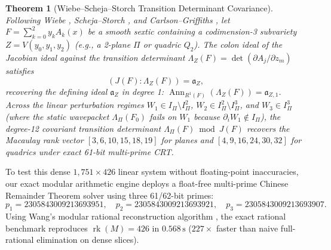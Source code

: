 \documentclass[11pt,a4paper]{article}
\newtheorem{theorem}{Theorem}[section]
\theoremstyle{definition}
\theoremstyle{remark}
\DeclareMathOperator{\rk}{rk}
\begin{document}
\begin{theorem}[Wiebe--Scheja--Storch Transition Determinant Covariance]
\label{thm:wiebe_covariance}
Following Wiebe \cite{Wiebe1969}, Scheja--Storch \cite{SchejaStorch1975}, and Carlson--Griffiths \cite{CarlsonGriffiths1980}, let $F = \sum_{k=0}^2 y_k A_k(x)$ be a smooth sextic containing a codimension-3 subvariety $Z = V(y_0, y_1, y_2)$ (e.g., a 2-plane $\Pi$ or quadric $Q_2$). The colon ideal of the Jacobian ideal against the transition determinant $\Lambda_Z(F) = \det(\partial A_j / \partial z_m)$ satisfies
\begin{equation}
(J(F) : \Lambda_Z(F)) = \mathfrak{a}_Z,
\end{equation}
recovering the defining ideal $\mathfrak{a}_Z$ in degree 1: $\operatorname{Ann}_{R^1(F)}(\Lambda_Z(F)) = \mathfrak{a}_{Z, 1}$. Across the linear perturbation regimes $W_1 \in I_\Pi \setminus I_\Pi^2$, $W_2 \in I_\Pi^2 \setminus I_\Pi^3$, and $W_3 \in I_\Pi^3$ (where the static wavepacket $\Lambda_\Pi(F_0)$ fails on $W_1$ because $\partial_i W_1 \notin I_\Pi$), the degree-12 covariant transition determinant $\Lambda_\Pi(F) \bmod J(F)$ recovers the Macaulay rank vector $[3, 6, 10, 15, 18, 19]$ for planes and $[4, 9, 16, 24, 30, 32]$ for quadrics under exact 61-bit multi-prime CRT.
\end{theorem}

To test this dense $1,751 \times 426$ linear system without floating-point inaccuracies, our exact modular arithmetic engine deploys a float-free multi-prime Chinese Remainder Theorem solver using three 61/62-bit primes:
\begin{equation}
p_1 = 2305843009213693951, \quad p_2 = 2305843009213693921, \quad p_3 = 2305843009213693907.
\end{equation}
Using Wang's modular rational reconstruction algorithm \cite{Wang1981}, the exact rational benchmark reproduces $\rk(M) = 426$ in $0.568\,\mathrm{s}$ ($227\times$ faster than naive full-rational elimination on dense slices).
\end{document}
